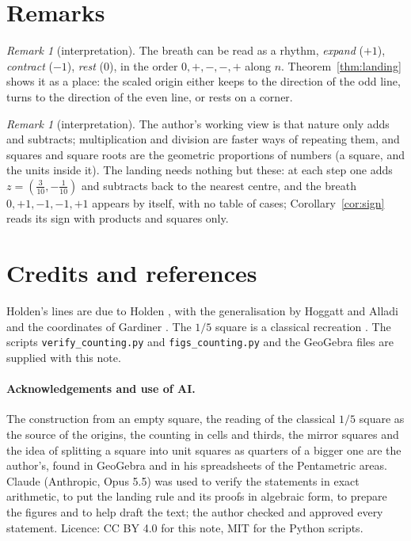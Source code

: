 \documentclass[11pt,a4paper]{article}
\theoremstyle{plain}
\theoremstyle{definition}
\theoremstyle{remark}
\newtheorem{remark}[theorem]{Remark}
\begin{document}
\section{Remarks}
\begin{remark}[interpretation]
The breath can be read as a rhythm, \emph{expand} ($+1$), \emph{contract} ($-1$), \emph{rest} ($0$), in the order $0,+,-,-,+$ along $n$. Theorem~\ref{thm:landing} shows it as a place: the scaled origin either keeps to the direction of the odd line, turns to the direction of the even line, or rests on a corner.
\end{remark}
\begin{remark}[interpretation]
The author's working view is that nature only adds and subtracts; multiplication and division are faster ways of repeating them, and squares and square roots are the geometric proportions of numbers (a square, and the units inside it). The landing needs nothing but these: at each step one adds $z=(\tfrac3{10},-\tfrac1{10})$ and subtracts back to the nearest centre, and the breath $0,+1,-1,-1,+1$ appears by itself, with no table of cases; Corollary~\ref{cor:sign} reads its sign with products and squares only.
\end{remark}

\section*{Credits and references}
Holden's lines are due to Holden \cite{holden}, with the generalisation by Hoggatt and Alladi \cite{hoggatt} and the coordinates of Gardiner \cite{gardiner}. The $1/5$ square is a classical recreation \cite{claraso}. The scripts \texttt{verify\_counting.py} and \texttt{figs\_counting.py} and the GeoGebra files are supplied with this note.

\paragraph{Acknowledgements and use of AI.} The construction from an empty square, the reading of the classical $1/5$ square as the source of the origins, the counting in cells and thirds, the mirror squares and the idea of splitting a square into unit squares as quarters of a bigger one are the author's, found in GeoGebra and in his spreadsheets of the Pentametric areas. Claude (Anthropic, Opus 5.5) was used to verify the statements in exact arithmetic, to put the landing rule and its proofs in algebraic form, to prepare the figures and to help draft the text; the author checked and approved every statement. Licence: CC BY 4.0 for this note, MIT for the Python scripts.
\end{document}
